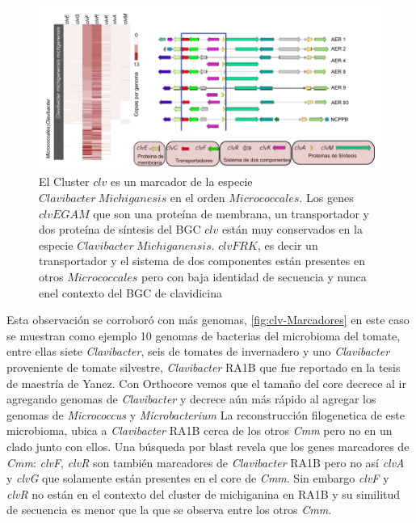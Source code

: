 \documentclass[]{article}
\begin{document}
\begin{figure}[h!tbp]
\centering
\includegraphics[angle = 0,scale = .6]{chapter1/clv.png}
\caption[ El Cluster $clv$ es un marcador de la especie $Clavibacter~Michiganesis$ en el orden $Micrococcales$.]{\footnotesize{El Cluster $clv$ es un marcador de la especie $Clavibacter~Michiganesis$ en el orden $Micrococcales$. Los genes $clvEGAM$ que son una proteína de membrana, un transportador y dos proteína de síntesis del BGC $clv$ están muy conservados en la especie $Clavibacter~Michiganensis$. $clvFRK$, es decir un transportador y el sistema de dos componentes están presentes en otros $Micrococcales$ pero con baja identidad de secuencia y nunca enel contexto del BGC de clavidicina}}
\label{fig:clv-Marcadores}
\end{figure}

Esta observación se corroboró con más genomas,
\autoref{fig:clv-Marcadores} en este caso se muestran como ejemplo 10
genomas de bacterias del microbioma del tomate, entre ellas siete
\emph{Clavibacter}, seis de tomates de invernadero y uno
\emph{Clavibacter} proveniente de tomate silvestre, \emph{Clavibacter}
RA1B que fue reportado en la tesis de maestría de Yanez. Con Orthocore
vemos que el tamaño del core decrece al ir agregando genomas de
\emph{Clavibacter} y decrece aún más rápido al agregar los genomas de
\emph{Micrococcus} y \emph{Microbacterium} La reconstrucción
filogenetica de este microbioma, ubica a \emph{Clavibacter} RA1B cerca
de los otros \emph{Cmm} pero no en un clado junto con ellos. Una
búsqueda por blast revela que los genes marcadores de \emph{Cmm}:
\emph{clvF}, \emph{clvR} son también marcadores de \emph{Clavibacter}
RA1B pero no así \emph{clvA} y \emph{clvG} que solamente están presentes
en el core de \emph{Cmm}. Sin embargo \emph{clvF} y \emph{clvR} no están
en el contexto del cluster de michiganina en RA1B y su similitud de
secuencia es menor que la que se observa entre los otros \emph{Cmm}.
\end{document}
